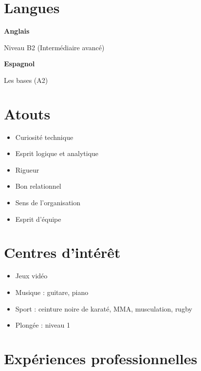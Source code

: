 \documentclass[11pt, a4paper]{article}
\begin{document}
\begin{minipage}[t]{0.33\textwidth}

\section*{Langues}
\textbf{Anglais}\par
{\small\color{muted}Niveau B2 (Intermédiaire avancé)}\par
\vspace{6pt}
\textbf{Espagnol}\par
{\small\color{muted}Les bases (A2)}\par

\section*{Atouts}
\begin{itemize}[leftmargin=12pt, itemsep=3pt, topsep=2pt, label={\small\color{accent}\textbullet}]
    \item \small Curiosité technique
    \item \small Esprit logique et analytique
    \item \small Rigueur
    \item \small Bon relationnel
    \item \small Sens de l'organisation
    \item \small Esprit d'équipe
\end{itemize}

\section*{Centres d'intérêt}
\begin{itemize}[leftmargin=12pt, itemsep=4pt, topsep=2pt, label={\small\color{accent}\textbullet}]
    \item \small Jeux vidéo
    \item \small Musique : guitare, piano
    \item \small Sport : ceinture noire de karaté, MMA, musculation, rugby
    \item \small Plongée : niveau 1
\end{itemize}

\end{minipage}

\section*{Expériences professionnelles}
\end{document}

